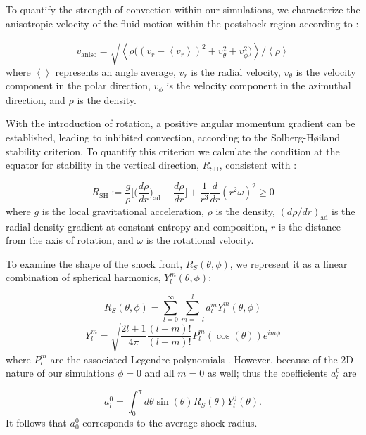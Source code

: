 \documentclass[twocolumn,times]{aastex62}  %
\begin{document}
To quantify the strength of convection within our simulations, we characterize the anisotropic velocity of the fluid motion within the postshock region according to \citet{takiwaki:2012}:

\begin{equation}
    v_{\mathrm{aniso}} = \sqrt{\left<\rho\Big((v_r - \left<v_r\right>)^2 + v_\theta^2 + v_\phi^2\Big) \right>/\left<\rho\right>}
\label{eq:vaniso}
\end{equation}
where $\left<\right>$ represents an angle average, $v_r$ is the radial velocity, $v_\theta$ is the velocity component in the polar direction, $v_\phi$ is the velocity component in the azimuthal direction, and $\rho$ is the density.  

With the introduction of rotation, a positive angular momentum gradient can be established, leading to inhibited convection, according to the Solberg-H{\o}iland stability criterion.  To quantify this criterion we calculate the condition at the equator for stability in the vertical direction, $R_{\mathrm{SH}}$, consistent with \citet{heger:2000}:

\begin{equation}
    R_{\mathrm{SH}} := \frac{g}{\rho}\Bigg[\Bigg(\frac{d\rho}{dr}\Bigg)_{\mathrm{ad}}-\frac{d\rho}{dr}\Bigg] + \frac{1}{r^3}\frac{d}{dr}(r^2\omega)^2 \geq 0
\label{eq:SHI}
\end{equation}
where $g$ is the local gravitational acceleration, $\rho$ is the density, $(d\rho/dr)_{\mathrm{ad}}$ is the radial density gradient at constant entropy and composition, $r$ is the distance from the axis of rotation, and $\omega$ is the rotational velocity. 

To examine the shape of the shock front, $R_S(\theta,\phi)$, we represent it as a linear combination of spherical harmonics, $Y_l^m(\theta,\phi)$:

\begin{equation}
    R_S(\theta,\phi) = \sum_{l=0}^\infty \sum_{m=-l}^{l} a_l^m Y_l^m(\theta,\phi)
\end{equation}
\begin{equation}
    Y_l^m = \sqrt{\frac{2l+1}{4\pi}\frac{(l-m)!}{(l+m)!}}P_l^m(\cos(\theta)) e^{im\phi}
\end{equation}
where $P_l^m$ are the associated Legendre polynomials \citep{burrows:2012,takiwaki:2012}.  However, because of the 2D nature of our simulations $\phi = 0$ and all $m = 0$ as well; thus the coefficients $a_l^0$ are

\begin{equation}
    a_l^0 = \int_0^\pi d\theta \sin(\theta)R_S(\theta)Y_l^0(\theta) .
\label{eq:sho_coeff}
\end{equation}
It follows that $a_0^0$ corresponds to the average shock radius.
\end{document}
